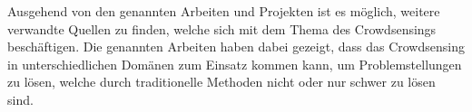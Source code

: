 Ausgehend von den genannten Arbeiten und Projekten ist es möglich, weitere verwandte Quellen zu finden, welche sich mit dem Thema des Crowdsensings beschäftigen. Die genannten Arbeiten haben dabei gezeigt, dass das Crowdsensing in unterschiedlichen Domänen zum Einsatz kommen kann, um Problemstellungen zu lösen, welche durch traditionelle Methoden nicht oder nur schwer zu lösen sind.